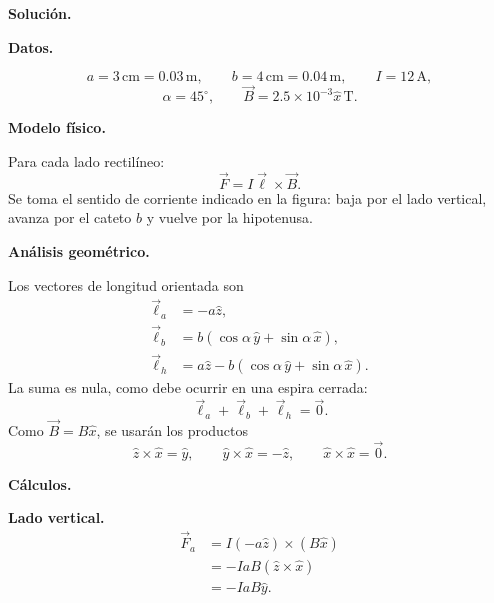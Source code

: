 \documentclass[11pt]{article}
\newcommand{\soluciontitulo}{%
  \par\medskip
  \noindent\textbf{Solución.}\par
  \smallskip
}
\begin{document}
\soluciontitulo

\par\medskip\noindent\textbf{Datos.}\par\smallskip
\begin{equation*}
    a=3\,\mathrm{cm}=0.03\,\mathrm m,
    \qquad
    b=4\,\mathrm{cm}=0.04\,\mathrm m,
    \qquad
    I=12\,\mathrm A,
\end{equation*}
\begin{equation*}
    \alpha=45^\circ,
    \qquad
    \vec B=2.5\times10^{-3}\hat x\,\mathrm T.
\end{equation*}

\par\medskip\noindent\textbf{Modelo físico.}\par\smallskip
Para cada lado rectil\'ineo:
\begin{equation*}
    \vec F=I\vec\ell\times\vec B.
\end{equation*}
Se toma el sentido de corriente indicado en la figura: baja por el lado vertical, avanza por el cateto $b$ y vuelve por la hipotenusa.

\par\medskip\noindent\textbf{Análisis geométrico.}\par\smallskip
Los vectores de longitud orientada son
\begin{align*}
    \vec\ell_a&=-a\hat z,\\
    \vec\ell_b&=b(\cos\alpha\,\hat y+\sin\alpha\,\hat x),\\
    \vec\ell_h&=a\hat z-b(\cos\alpha\,\hat y+\sin\alpha\,\hat x).
\end{align*}
La suma es nula, como debe ocurrir en una espira cerrada:
\begin{equation*}
    \vec\ell_a+\vec\ell_b+\vec\ell_h=\vec0.
\end{equation*}
Como $\vec B=B\hat x$, se usar\'an los productos
\begin{equation*}
    \hat z\times\hat x=\hat y,
    \qquad
    \hat y\times\hat x=-\hat z,
    \qquad
    \hat x\times\hat x=\vec0.
\end{equation*}

\par\medskip\noindent\textbf{Cálculos.}\par\smallskip
\textbf{Lado vertical.}
\begin{align*}
    \vec F_a
    &=I(-a\hat z)\times(B\hat x)\\
    &=-IaB(\hat z\times\hat x)\\
    &=-IaB\hat y.
\end{align*}
\end{document}
